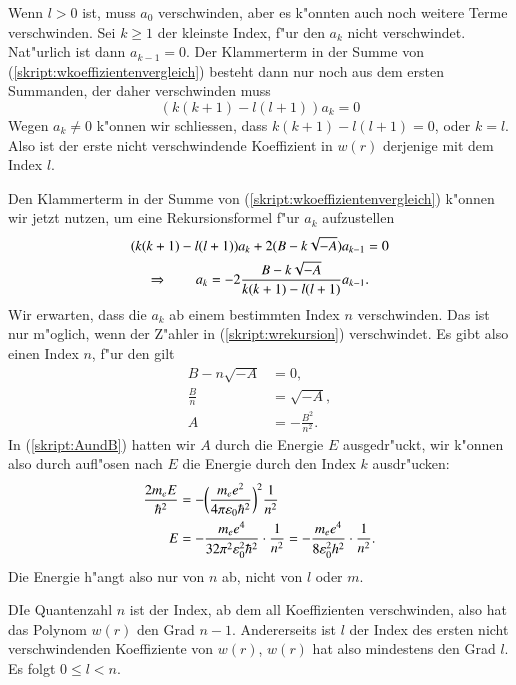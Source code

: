 Wenn $l>0$ ist, muss $a_0$ verschwinden, aber es k"onnten auch noch
weitere Terme verschwinden.
Sei $k\ge 1$ der kleinste Index, f"ur den $a_k$ nicht verschwindet.
Nat"urlich ist dann $a_{k-1}=0$.
Der Klammerterm in der Summe von (\ref{skript:wkoeffizientenvergleich})
besteht dann nur noch aus dem ersten Summanden, der daher verschwinden
muss
\[
(k(k+1)-l(l+1))a_k=0
\]
Wegen $a_k\ne 0$ k"onnen wir schliessen, dass $k(k+1)-l(l+1)=0$,
oder $k=l$.
Also ist der erste nicht verschwindende
Koeffizient in $w(r)$ derjenige mit dem Index $l$.

Den Klammerterm in der Summe von (\ref{skript:wkoeffizientenvergleich})
k"onnen wir jetzt nutzen, um eine Rekursionsformel f"ur $a_k$
aufzustellen
\begin{gather}
(k(k+1)-l(l+1))a_k+2(B-k\sqrt{-A})a_{k-1} =0
\notag
\\
\Rightarrow\qquad
a_k=-2\frac{B-k\sqrt{-A}}{k(k+1)-l(l+1)} a_{k-1}.
\label{skript:wrekursion}
\end{gather}
Wir erwarten, dass die $a_k$ ab einem bestimmten Index $n$ verschwinden.
Das ist nur m"oglich, wenn der Z"ahler in (\ref{skript:wrekursion})
verschwindet. Es gibt also einen Index $n$, f"ur den gilt
\begin{align*}
B-n\sqrt{-A}&=0,
\\
\frac{B}{n}&=\sqrt{-A},
\\
A&=-\frac{B^2}{n^2}.
\end{align*}
In (\ref{skript:AundB}) hatten wir $A$ durch die Energie $E$ ausgedr"uckt,
wir k"onnen also durch aufl"osen nach $E$ die Energie durch den Index $k$
ausdr"ucken:
\begin{align}
\frac{2m_eE}{\hbar^2}
&=
-
\biggl(
\frac{m_ee^2}{4\pi\varepsilon_0\hbar^2}
\biggr)^2
\frac{1}{n^2}
\notag
\\
E&=-\frac{m_e e^4}{32\pi^2\varepsilon_0^2\hbar^2}\cdot\frac{1}{n^2}
=-\frac{m_ee^4}{8\varepsilon_0^2h^2}\cdot\frac{1}{n^2}.
\label{skript:henergy}
\end{align}
Die Energie h"angt also nur von $n$ ab, nicht von $l$ oder $m$.

DIe Quantenzahl $n$ ist der Index, ab dem all Koeffizienten verschwinden,
also hat das Polynom $w(r)$ den Grad $n-1$.
Andererseits ist $l$ der Index des ersten nicht verschwindenden Koeffiziente
von $w(r)$, $w(r)$ hat also mindestens den Grad $l$. Es folgt $0\le l < n$.

